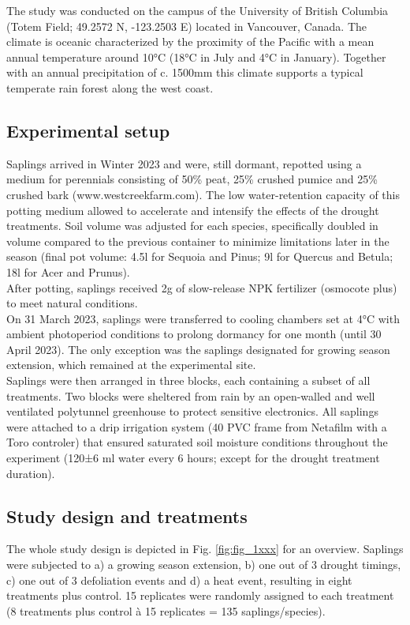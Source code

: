\documentclass{article}
\begin{document}
	
	The study was conducted on the campus of the University of British Columbia (Totem Field; 49.2572 N, -123.2503 E) located in Vancouver, Canada. The climate is oceanic characterized by the proximity of the Pacific with a mean annual temperature around 10°C (18°C in July and 4°C in January). Together with an annual precipitation of c. 1500mm this climate supports a typical temperate rain forest along the west coast.
	
	\subsection*{Experimental setup}
		
	Saplings arrived in Winter 2023 and were, still dormant, repotted using a medium for perennials consisting of 50\% peat, 25\% crushed pumice and 25\% crushed bark (www.westcreekfarm.com). The low water-retention capacity of this potting medium allowed to accelerate and intensify the effects of the drought treatments. Soil volume was adjusted for each species, specifically doubled in volume compared to the previous container to minimize limitations later in the season (final pot volume: 4.5l for Sequoia and Pinus; 9l for Quercus and Betula; 18l for Acer and Prunus). \\ 
	After potting, saplings received 2g of slow-release NPK fertilizer (osmocote plus) to meet natural conditions. \\ 
	On 31 March 2023, saplings were transferred to cooling chambers set at 4°C with ambient photoperiod conditions to prolong dormancy for one month (until 30 April 2023). The only exception was the saplings designated for growing season extension, which remained at the experimental site. \\ 
	Saplings were then arranged in three blocks, each containing a subset of all treatments. Two blocks were sheltered from rain by an open-walled and well ventilated polytunnel greenhouse to protect sensitive electronics. All saplings were attached to a drip irrigation system (40 PVC frame from Netafilm with a Toro controler) that ensured saturated soil moisture conditions throughout the experiment (120±6 ml water every 6 hours;  except for the drought treatment duration). \\ 
	
		\subsection*{Study design and treatments}
	The whole study design is depicted in Fig. \ref{fig:fig_1xxx} for an overview. Saplings were subjected to a) a growing season extension, b) one out of 3 drought timings, c) one out of 3 defoliation events and d) a heat event, resulting in eight treatments plus control. 15 replicates were randomly assigned to each treatment (8 treatments plus control à 15 replicates = 135 saplings/species). \\  
	
\end{document}
